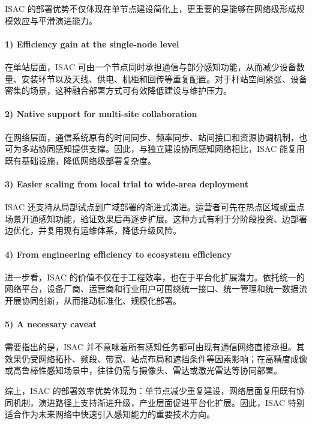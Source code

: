 ISAC 的部署优势不仅体现在单节点建设简化上，更重要的是能够在网络级形成规模效应与平滑演进能力。

\paragraph{1) Efficiency gain at the single-node level}
在单站层面，ISAC 可由一个节点同时承担通信与部分感知功能，从而减少设备数量、安装环节以及天线、供电、机柜和回传等重复配置。对于杆站空间紧张、设备密集的场景，这种融合部署方式可有效降低建设与维护压力。

\paragraph{2) Native support for multi-site collaboration}
在网络层面，通信系统原有的时间同步、频率同步、站间接口和资源协调机制，也可为多站协同感知提供支撑\cite{Zhang2021ISAC6G,Liu2022ISAC}。因此，与独立建设协同感知网络相比，ISAC 能复用既有基础设施，降低网络级部署复杂度。

\paragraph{3) Easier scaling from local trial to wide-area deployment}
ISAC 还支持从局部试点到广域部署的渐进式演进。运营者可先在热点区域或重点场景开通感知功能，验证效果后再逐步扩展。这种方式有利于分阶段投资、边部署边优化，并复用现有运维体系，降低升级风险。

\paragraph{4) From engineering efficiency to ecosystem efficiency}
进一步看，ISAC 的价值不仅在于工程效率，也在于平台化扩展潜力。依托统一的网络平台，设备厂商、运营商和行业用户可围绕统一接口、统一管理和统一数据流开展协同创新\cite{IMT2030Framework,Letaief2019Roadmap}，从而推动标准化、规模化部署。

\paragraph{5) A necessary caveat}
需要指出的是，ISAC 并不意味着所有感知任务都可由现有通信网络直接承担。其效果仍受网络拓扑、频段、带宽、站点布局和遮挡条件等因素影响；在高精度成像或高鲁棒性感知场景中，往往仍需与摄像头、雷达或激光雷达等协同部署\cite{Zhang2021ISAC6G, Wei2023Integrated}。

综上，ISAC 的部署效率优势体现为：单节点减少重复建设，网络层面复用既有协同机制，演进路径上支持渐进升级，产业层面促进平台化扩展。因此，ISAC 特别适合作为未来网络中快速引入感知能力的重要技术方向。

